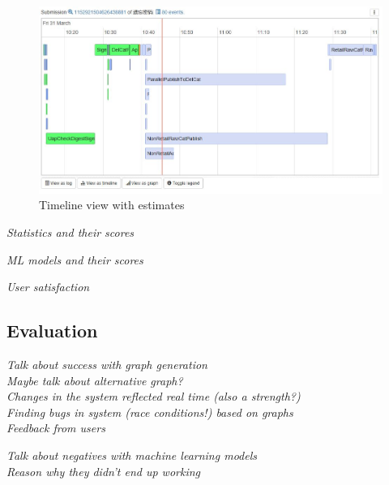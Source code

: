 \documentclass[english,12pt,a4paper,pdftex,sci,utf8]{aaltothesis}
\theoremstyle{definition}
\newcommand{\nyi}[1]{\noindent\colorbox{nyibg}{\textcolor{nyitext}{\emph{#1}}}}
\begin{document}
\begin{figure}[htb]
\centering \includegraphics[width=\linewidth]{gfx/estimates.jpg}
\caption{Timeline view with estimates \label{fig:estimates}}
\end{figure}

\nyi{Statistics and their scores}

\nyi{ML models and their scores}

\nyi{User satisfaction}

\subsection{Evaluation}
\label{sec:evaluation}



\nyi{Talk about success with graph generation}\\
\nyi{Maybe talk about alternative graph?}\\
\nyi{Changes in the system reflected real time (also a strength?)}\\
\nyi{Finding bugs in system (race conditions!) based on graphs}\\
\nyi{Feedback from users}

\nyi{Talk about negatives with machine learning models}\\
\nyi{Reason why they didn't end up working}
\end{document}

